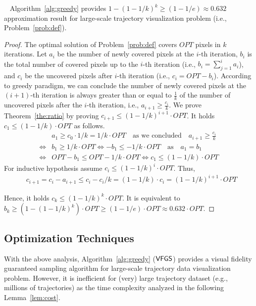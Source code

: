 \begin{theorem}~\label{the:ratio}
Algorithm~\ref{alg:greedy} provides $1-(1-1/k)^k \geq (1-1/e) \approx 0.632$ approximation result for large-scale trajectory visualization problem (i.e., Problem~\ref{prob:def}).
\end{theorem}

\begin{proof}
The optimal solution of Problem~\ref{prob:def} covers $OPT$ pixels in $k$ iterations.
Let $a_i$ be the number of newly covered pixels at the $i$-th iteration, $b_i$ is the total number of covered pixels up to the $i$-th iteration (i.e., $b_i = \sum_{j=1}^{i}a_i$),
and $c_i$ be the uncovered pixels after $i$-th iteration (i.e., $c_i = OPT-b_i$).
According to greedy paradigm, we can conclude the number of newly covered pixels at the $(i+1)$-th iteration is always greater than or equal to $\frac{1}{k}$ of the number of uncovered pixels after the $i$-th iteration, i.e., $a_{i+1} \geq \frac{c_i}{k}$.
We prove Theorem~\ref{the:ratio} by proving $c_{i+1} \leq (1-1/k)^{i+1} \cdot OPT$.
It holds $c_1 \leq (1-1/k) \cdot OPT$ as follows.
\begin{align} \nonumber
& a_1 \geq c_0 \cdot 1/k = 1/k \cdot OPT \text{~~~as we concluded~~~} a_{i+1} \geq \frac{c_i}{k}\\ \nonumber
 \Leftrightarrow  & b_1 \geq 1/k \cdot OPT  \Leftrightarrow  -b_1 \leq - 1/k \cdot OPT  \text{~~~as~~~} a_1 = b_1\\ \nonumber
 \Leftrightarrow & OPT - b_ 1 \leq OPT - 1/k \cdot OPT  \Leftrightarrow  c_1 \leq (1-1/k) \cdot OPT
\end{align}
For inductive hypothesis assume $c_{i} \leq (1-1/k)^i \cdot OPT$. Thus,
\begin{align} \nonumber
& c_{i+1} = c_i - a_{i+1} \leq c_i - c_i/k = (1-1/k) \cdot c_i = (1-1/k)^{i+1} \cdot OPT
\end{align}

Hence, it holds $c_k \leq (1-1/k)^{k} \cdot OPT$.
It is equivalent to $b_k \geq (1 - (1-1/k)^{k}) \cdot OPT \geq (1-1/e) \cdot OPT \approx 0.632 \cdot OPT$.
\end{proof}


\subsection{Optimization Techniques}\label{sec:opt}
With the above analysis, Algorithm~\ref{alg:greedy} ($\mathsf{VFGS}$) provides a visual fidelity guaranteed sampling algorithm for large-scale trajectory data visualization problem.
However, it is inefficient for (very) large trajectory dataset (e.g., millions of trajectories) as the time complexity analyzed in the following Lemma~\ref{lem:cost}.

